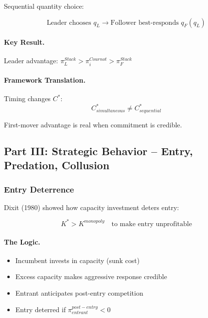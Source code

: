 Sequential quantity choice:

\begin{equation}
\boxed{
\text{Leader chooses } q_L \to \text{Follower best-responds } q_F(q_L)
}
\label{eq:stackelberg}
\end{equation}

\paragraph{Key Result.}
Leader advantage: $\pi_L^{Stack} > \pi_i^{Cournot} > \pi_F^{Stack}$

\paragraph{Framework Translation.}
Timing changes $C^*$:
\begin{equation}
C^*_{simultaneous} \neq C^*_{sequential}
\end{equation}

First-mover advantage is real when commitment is credible.

\subsection{Part III: Strategic Behavior – Entry, Predation, Collusion}

\subsubsection{Entry Deterrence}

Dixit (1980) showed how capacity investment deters entry:

\begin{equation}
\boxed{
K^* > K^{monopoly} \quad \text{to make entry unprofitable}
}
\label{eq:dixit}
\end{equation}

\paragraph{The Logic.}
\begin{itemize}
    \item Incumbent invests in capacity (sunk cost)
    \item Excess capacity makes aggressive response credible
    \item Entrant anticipates post-entry competition
    \item Entry deterred if $\pi_{entrant}^{post-entry} < 0$
\end{itemize}

